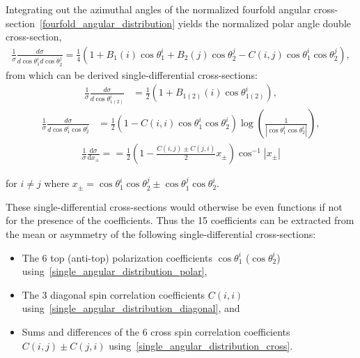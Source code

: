 Integrating out the azimuthal angles of the normalized fourfold angular cross-section~\ref{fourfold_angular_distribution} yields the normalized polar angle double cross-section,
\begin{align}
\frac{1}{\sigma} \frac{d \sigma}{d \cos \theta_1^i d \cos \theta_2^j}=\frac{1}{4}\left(1+B_1(i) \cos \theta_1^i+B_2(j) \cos \theta_2^j-C(i, j) \cos \theta_1^i \cos \theta_2^j\right),
\label{double_angular_distribution}
\end{align}
from which can be derived single-differential cross-sections:
\begin{align}
\frac{1}{\sigma} \frac{d \sigma}{d \cos \theta_{1(2)}^i} & =\frac{1}{2}\left(1+B_{1(2)}(i) \cos \theta_{1(2)}^i\right),
\label{single_angular_distribution_polar}
\end{align}
\begin{align}
\frac{1}{\sigma} \frac{d \sigma}{d \cos \theta_1^i \cos \theta_2^i} & =\frac{1}{2}\left(1-C(i, i) \cos \theta_1^i \cos \theta_2^i\right) \log \left(\frac{1}{\left \vert \cos \theta_1^i \cos \theta_2^i\right \vert}\right),
\label{single_angular_distribution_diagonal}
\end{align}
\begin{align}
\frac{1}{\sigma} \frac{\mathrm{d} \sigma}{\mathrm{d} x_{\pm}} = 
= \frac{1}{2} \left(1-\frac{C(i, j) \pm C(j, i)}{2} {x_{\pm}} \right) \cos ^{-1} \left \vert x_{\pm} \right \vert
\label{single_angular_distribution_cross}
\end{align}
\begin{center}
for $i \neq j$ where $x_{\pm} = \cos \theta_1^i \cos \theta_2^j \pm \cos \theta_1^j \cos \theta_2^i$.
\end{center}
These single-differential cross-sections would otherwise be even functions if not for the presence of the coefficients.
Thus the 15 coefficients can be extracted from the mean or asymmetry of the following single-differential cross-sections:
\begin{itemize}
\item The 6 top (anti-top) polarization coefficients $\cos\theta_1^i$ ($\cos\theta_2^i$) using~\ref{single_angular_distribution_polar},
\item  The 3 diagonal spin correlation coefficients $C(i,i)$ using~\ref{single_angular_distribution_diagonal}, and
\item  Sums and differences of the 6 cross spin correlation coefficients $C(i,j) \pm C(j,i)$ using~\ref{single_angular_distribution_cross}.
\end{itemize}

